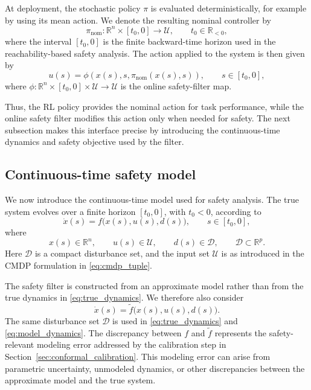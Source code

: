 \documentclass[letterpaper,10pt,conference]{ieeeconf}
\newcommand{\R}{\mathbb{R}}
\newcommand{\fapp}{\widetilde{f}}
\newcommand{\xv}{x}
\newcommand{\uv}{u}
\newcommand{\dv}{d}
\newcommand{\Uv}{\mathcal{U}}
\newcommand{\Dv}{\mathcal{D}}
\begin{document}
At deployment, the stochastic policy $\pi$ is evaluated deterministically, for
example by using its mean action. We denote the resulting nominal controller by
\begin{equation}
    \pi_{\mathrm{nom}}:\R^n\times[t_0,0]\to\Uv,
    \qquad t_0\in\R_{<0},
    \label{eq:nominal_policy}
\end{equation}
where the interval $[t_0,0]$ is the finite backward-time horizon used in the
reachability-based safety analysis. The action applied to the system is then
given by
\begin{equation}
    \uv(s)=\phi\!\left(\xv(s),s,\pi_{\mathrm{nom}}(\xv(s),s)\right),
    \qquad s\in[t_0,0],
    \label{eq:shield_map}
\end{equation}
where $\phi:\R^n\times[t_0,0]\times\Uv\to\Uv$ is the online safety-filter map.

Thus, the RL policy provides the nominal action for task performance, while
the online safety filter modifies this action only when needed for safety. The
next subsection makes this interface precise by introducing the continuous-time
dynamics and safety objective used by the filter.




\subsection{Continuous-time safety model}

We now introduce the continuous-time model used for safety analysis. The true
system evolves over a finite horizon $[t_0,0]$, with $t_0<0$, according to
\begin{equation}
    \dot{\xv}(s)=f\bigl(\xv(s),\uv(s),\dv(s)\bigr),
    \qquad s\in[t_0,0],
    \label{eq:true_dynamics}
\end{equation}
where
\begin{equation}
    \xv(s)\in\R^n,
    \qquad
    \uv(s)\in\Uv,
    \qquad
    \dv(s)\in\Dv,
    \qquad
    \Dv\subset\R^p.
    \label{eq:spaces}
\end{equation}
Here $\Dv$ is a compact disturbance set, and the input set $\Uv$ is as
introduced in the CMDP formulation in \eqref{eq:cmdp_tuple}.

The safety filter is constructed from an approximate model rather than from the
true dynamics in \eqref{eq:true_dynamics}. We therefore also consider
\begin{equation}
    \dot{\xv}(s)=\fapp\bigl(\xv(s),\uv(s),\dv(s)\bigr).
    \label{eq:model_dynamics}
\end{equation}
The same disturbance set $\Dv$ is used in \eqref{eq:true_dynamics} and
\eqref{eq:model_dynamics}. The discrepancy between $f$ and $\fapp$ represents
the safety-relevant modeling error addressed by the calibration step in
Section~\ref{sec:conformal_calibration}. This modeling error can arise from parametric uncertainty, unmodeled dynamics,
or other discrepancies between the approximate model and the true system.
\end{document}
